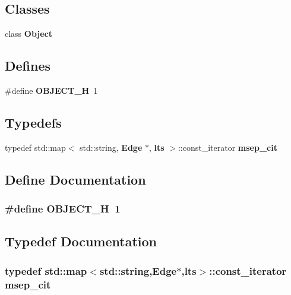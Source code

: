 \subsection*{Classes}
\begin{CompactItemize}
\item 
class {\bf Object}
\end{CompactItemize}
\subsection*{Defines}
\begin{CompactItemize}
\item 
\#define {\bf OBJECT\_\-H}~1
\end{CompactItemize}
\subsection*{Typedefs}
\begin{CompactItemize}
\item 
typedef std::map$<$ std::string, {\bf Edge} $\ast$, {\bf lts} $>$::const\_\-iterator {\bf msep\_\-cit}
\end{CompactItemize}


\subsection{Define Documentation}
\subsubsection{\setlength{\rightskip}{0pt plus 5cm}\#define OBJECT\_\-H~1}\label{object_8h_a8010467994983b5e7d22edee6ab6806}




\subsection{Typedef Documentation}
\subsubsection{\setlength{\rightskip}{0pt plus 5cm}typedef std::map$<$std::string,{\bf Edge}$\ast$,{\bf lts}$>$::const\_\-iterator {\bf msep\_\-cit}}\label{object_8h_0b55971f5102e117df638ddc4acd0182}


